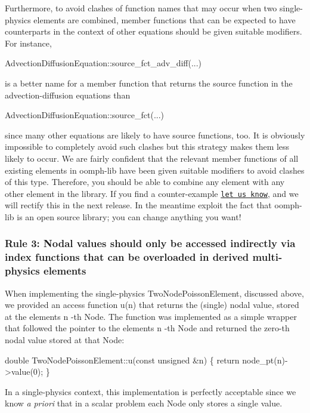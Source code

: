 Furthermore, to avoid clashes of function names that may occur when two single-\/physics elements are combined, member functions that can be expected to have counterparts in the context of other equations should be given suitable modifiers. For instance, 
\begin{DoxyCode}
AdvectionDiffusionEquation::source\_fct\_adv\_diff(...)
\end{DoxyCode}
 is a better name for a member function that returns the source function in the advection-\/diffusion equations than 
\begin{DoxyCode}
AdvectionDiffusionEquation::source\_fct(...)
\end{DoxyCode}
 since many other equations are likely to have source functions, too. It is obviously impossible to completely avoid such clashes but this strategy makes them less likely to occur. We are fairly confident that the relevant member functions of all existing elements in {\ttfamily oomph-\/lib} have been given suitable modifiers to avoid clashes of this type. Therefore, you should be able to combine any element with any other element in the library. If you find a counter-\/example \href{../../contact/html/index.html}{\tt let us know}, and we will rectify this in the next release. In the meantime exploit the fact that {\ttfamily oomph-\/lib} is an open source library; you can change anything you want!\hypertarget{index_index_fcts}{}\subsubsection{Rule 3\+: Nodal values should only be accessed indirectly via index functions that can be overloaded in derived multi-\/physics elements}\label{index_index_fcts}
When implementing the single-\/physics {\ttfamily Two\+Node\+Poisson\+Element}, discussed above, we provided an access function {\ttfamily u(n)} that returns the (single) nodal value, stored at the element\textquotesingle{}s {\ttfamily n} -\/th {\ttfamily Node}. The function was implemented as a simple wrapper that followed the pointer to the element\textquotesingle{}s {\ttfamily n} -\/th {\ttfamily Node} and returned the zero-\/th nodal value stored at that {\ttfamily Node\+:} 
\begin{DoxyCode}
\textcolor{keywordtype}{double} TwoNodePoissonElement::u(\textcolor{keyword}{const} \textcolor{keywordtype}{unsigned} &n) 
 \{
  \textcolor{keywordflow}{return} node\_pt(n)->value(0);
 \}
\end{DoxyCode}


In a single-\/physics context, this implementation is perfectly acceptable since we know {\itshape a} {\itshape priori} that in a scalar problem each {\ttfamily Node} only stores a single value.

